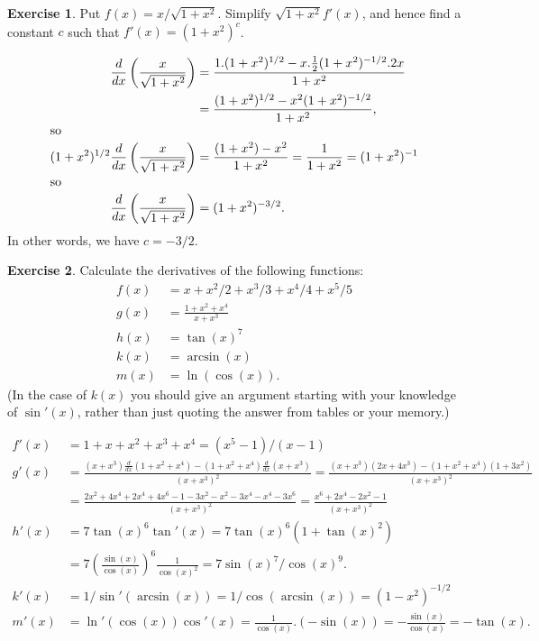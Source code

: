 \documentclass[a4paper]{amsart}
\theoremstyle{definition}
\newtheorem{exercise}{Exercise}[section]
\newenvironment{solution}{{\noindent \bf Solution:}}{}
\begin{document}
\begin{exercise}\label{ex-diff-misc-iii}
Put $f(x)=x/\sqrt{1+x^2}$.  Simplify $\sqrt{1+x^2}f'(x)$, and hence
  find a constant $c$ such that $f'(x)=(1+x^2)^c$.
\end{exercise}
\begin{solution}
  \begin{align*}
   \frac{d}{dx}\left(\frac{x}{\sqrt{1+x^2}}\right) 
    &= \frac{1.(1+x^2)^{1/2}-x.\frac{1}{2}(1+x^2)^{-1/2}.2x}
            {1+x^2} \\
    &= \frac{(1+x^2)^{1/2}-x^2(1+x^2)^{-1/2}}{1+x^2}, \\
  \intertext{so}
   (1+x^2)^{1/2}\frac{d}{dx}\left(\frac{x}{\sqrt{1+x^2}}\right) 
    &= \frac{(1+x^2)-x^2}{1+x^2} = \frac{1}{1+x^2} = (1+x^2)^{-1} \\
  \intertext{so}
   \frac{d}{dx}\left(\frac{x}{\sqrt{1+x^2}}\right) &= 
    (1+x^2)^{-3/2}.
  \end{align*}
  In other words, we have $c=-3/2$.
\end{solution}
\begin{exercise}\label{ex-diff-misc-iv}
Calculate the derivatives of the following functions:
 \begin{align*}
  f(x) &= x + x^2/2 + x^3/3 + x^4/4 + x^5/5 \\
  g(x) &= \frac{1+x^2+x^4}{x+x^3} \\
  h(x) &= \tan(x)^7 \\
  k(x) &= \arcsin(x) \\
  m(x) &= \ln(\cos(x)).
 \end{align*}
 (In the case of $k(x)$ you should give an argument starting with your
 knowledge of $\sin'(x)$, rather than just quoting the answer from
 tables or your memory.)
\end{exercise}
\begin{solution}
\begin{align*}
  f'(x) &= 1+x+x^2+x^3+x^4 = (x^5-1)/(x-1) \\
  g'(x) &= \frac{(x+x^3)\tfrac{d}{dx}(1+x^2+x^4) -
                 (1+x^2+x^4)\tfrac{d}{dx}(x+x^3)}{(x+x^3)^2}
         = \frac{(x+x^3)(2x+4x^3) - (1+x^2+x^4)(1+3x^2)}
                {(x+x^3)^2} \\
        &= \frac{2x^2+4x^4+2x^4+4x^6-1-3x^2-x^2-3x^4-x^4-3x^6}
                {(x+x^3)^2} 
         = \frac{x^6+2x^4-2x^2-1}{(x+x^3)^2} \\
  h'(x) &= 7\tan(x)^6\tan'(x) = 7\tan(x)^6(1+\tan(x)^2) \\
        &= 7\left(\frac{\sin(x)}{\cos(x)}\right)^6\frac{1}{\cos(x)^2}
         = 7\sin(x)^7/\cos(x)^9. \\
  k'(x) &= 1/\sin'(\arcsin(x)) = 1/\cos(\arcsin(x))
         = (1-x^2)^{-1/2} \\
  m'(x) &= \ln'(\cos(x))\cos'(x) 
         = \frac{1}{\cos(x)}.(-\sin(x))
         = -\frac{\sin(x)}{\cos(x)} = -\tan(x).
 \end{align*}
\end{solution}
\end{document}

